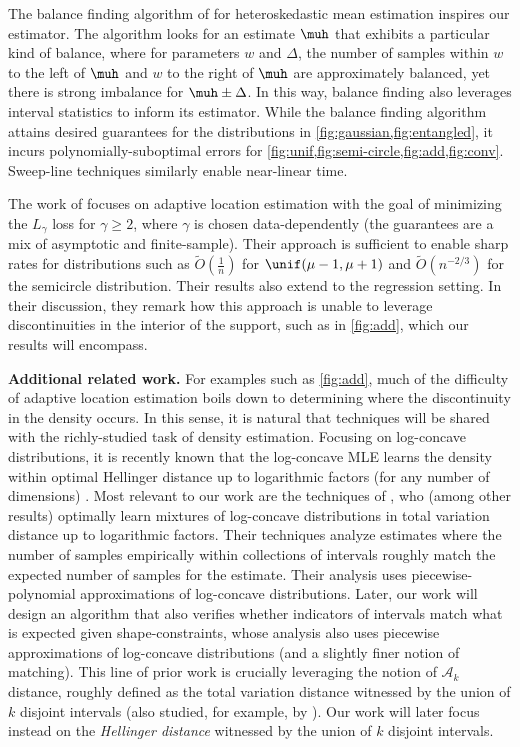 The balance finding algorithm of \cite{compton2024near} for heteroskedastic mean estimation inspires our estimator. The algorithm looks for an estimate $\muh$ that exhibits a particular kind of balance, where for parameters $w$ and $\Delta$, the number of samples within $w$ to the left of $\muh$ and $w$ to the right of $\muh$ are approximately balanced, yet there is strong imbalance for $\muh \pm \Delta$. In this way, balance finding also leverages interval statistics to inform its estimator. While the balance finding algorithm attains desired guarantees for the distributions in \cref{fig:gaussian,fig:entangled}, it incurs polynomially-suboptimal errors for \cref{fig:unif,fig:semi-circle,fig:add,fig:conv}. Sweep-line techniques similarly enable near-linear time.

The work of \cite{kao2024choosing} focuses on adaptive location estimation with the goal of minimizing the $L_\gamma$ loss for $\gamma \ge 2$, where $\gamma$ is chosen data-dependently (the guarantees are a mix of asymptotic and finite-sample). Their approach is sufficient to enable sharp rates for distributions such as $\tilde{O}(\frac{1}{n})$ for $\unif(\mu-1,\mu+1)$ and $\tilde{O}(n^{-2/3})$ for the semicircle distribution. Their results also extend to the regression setting. In their discussion, they remark how this approach is unable to leverage discontinuities in the interior of the support, such as in \cref{fig:add}, which our results will encompass.

\textbf{Additional related work. } For examples such as \cref{fig:add}, much of the difficulty of adaptive location estimation boils down to determining where the discontinuity in the density occurs. In this sense, it is natural that techniques will be shared with the richly-studied task of density estimation. Focusing on log-concave distributions, it is recently known that the log-concave MLE learns the density within optimal Hellinger distance up to logarithmic factors (for any number of dimensions) \cite{han2016approximation,kim2016global,kur2019optimality}. Most relevant to our work are the techniques of \cite{chan2014efficient}, who (among other results) optimally learn mixtures of log-concave distributions in total variation distance up to logarithmic factors. Their techniques analyze estimates where the number of samples empirically within collections of intervals roughly match the expected number of samples for the estimate. Their analysis uses piecewise-polynomial approximations of log-concave distributions. Later, our work will design an algorithm that also verifies whether indicators of intervals match what is expected given shape-constraints, whose analysis also uses piecewise approximations of log-concave distributions (and a slightly finer notion of matching). This line of prior work is crucially leveraging the notion of $\mathcal{A}_k$ distance, roughly defined as the total variation distance witnessed by the union of $k$ disjoint intervals (also studied, for example, by \cite{devroye2001combinatorial,diakonikolas2014testing,diakonikolas2015optimal,diakonikolas2017near,diakonikolas2019testing,diakonikolas2023testing}). Our work will later focus instead on the \textit{Hellinger distance} witnessed by the union of $k$ disjoint intervals. 

